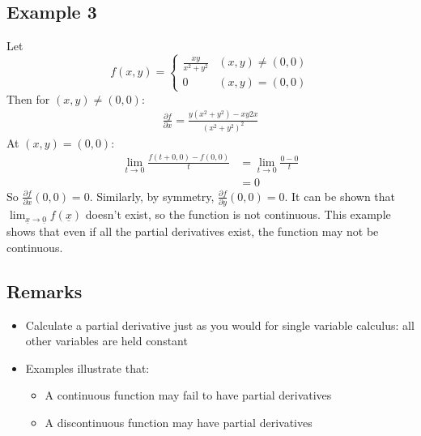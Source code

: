 \documentclass[12pt]{article}
\theoremstyle{definition}
\begin{document}
\subsection{Example 3}
Let \[f(x,y)=\begin{cases}\frac{xy}{x^2+y^2}&(x,y)\neq(0,0)\\ 0&(x,y)=(0,0)\end{cases}\]
Then for $(x,y)\neq (0,0)$:
\begin{align*}
    \frac{\partial f}{\partial x}=\frac{y(x^2+y^2)-xy2x}{(x^2+y^2)^2}
\end{align*}
At $(x,y)=(0,0)$:
\begin{align*}
    \lim_{t\to 0}\frac{f(t+0,0)-f(0,0)}{t}&=\lim_{t\to 0}\frac{0-0}{t}\\
    &=0
\end{align*}
So $\frac{\partial f}{\partial x}(0,0)=0$. Similarly, by symmetry, $\frac{\partial f}{\partial y}(0,0)=0$. It can be shown that $\lim_{\underline x\to\underline 0}f(\underline x)$ doesn't exist, so the function is not continuous. This example shows that even if all the partial derivatives exist, the function may not be continuous.

\subsection{Remarks}
\begin{itemize}
    \item Calculate a partial derivative just as you would for single variable calculus: all other variables are held constant
    \item Examples illustrate that:
    \begin{itemize}
        \item A continuous function may fail to have partial derivatives
        \item A discontinuous function may have partial derivatives
    \end{itemize}
\end{itemize}
\end{document}
